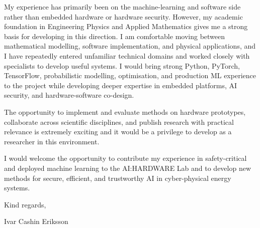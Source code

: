 \documentclass[11pt,a4paper]{moderncv}
\begin{document}
\hspace*{2em}
My experience has primarily been on the machine-learning and software side rather than embedded hardware or hardware security. However, my academic foundation in Engineering Physics and Applied Mathematics gives me a strong basis for developing in this direction. I am comfortable moving between mathematical modelling, software implementation, and physical applications, and I have repeatedly entered unfamiliar technical domains and worked closely with specialists to develop useful systems. I would bring strong Python, PyTorch, TensorFlow, probabilistic modelling, optimisation, and production ML experience to the project while developing deeper expertise in embedded platforms, AI security, and hardware-software co-design.

\hspace*{2em}
The opportunity to implement and evaluate methods on hardware prototypes, collaborate across scientific disciplines, and publish research with practical relevance is extremely exciting and it would be a privilege to develop as a researcher in this environment.

\hspace*{2em}
I would welcome the opportunity to contribute my experience in safety-critical and deployed machine learning to the AI:HARDWARE Lab and to develop new methods for secure, efficient, and trustworthy AI in cyber-physical energy systems.

\vspace{2em}
Kind regards, 

Ivar Cashin Eriksson
\end{document}
